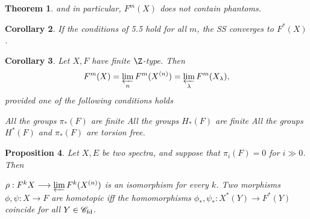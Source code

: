 \documentclass[11pt]{article}
\theoremstyle{plain}
\newtheorem{thm}{Theorem}[subsection]
\newtheorem{prop}[thm]{Proposition}
\newtheorem{cor}[thm]{Corollary}
\theoremstyle{definition}
\newcommand{\Specfd}{\scrC_\textup{fd}}
\begin{document}
{\begin{thm}
and in particular, $F^m(X)$ does not contain phantoms.
\end{thm}
\begin{cor}
If the conditions of 5.5 hold for all $m$, the SS converges to $F^*(X)$.
\end{cor}
\begin{cor}
Let $X,F$ have finite $\Z$-type. Then
\[F^m(X)=\varprojlim_n F^m(X^{(n)})=\varprojlim_\lambda F^m(X_\lambda),\]
provided one of the following conditions holds\upcol
\begin{itemise}
\itm[(i)] All the groups $\pi_*(F)$ are finite\upsemi
\itm[(ii)] All the groups $H_*(F)$ are finite\upsemi
\itm[(iii)] All the groups $H^*(F)$ and $\pi_*(F)$ are torsion free.
\end{itemise}
\end{cor}
\begin{prop}
Let $X,E$ be two spectra, and suppose that $\pi_i(F)=0$ for $i\gg0$. Then
\begin{itemise}
\itm[(i)] $\rho:F^kX\to\varprojlim F^k(X^{(n)})$ is an isomorphism for every
$k$.
\itm[(ii)] Two morphisms $\phi,\psi:X\to F$ are homotopic iff the homomorphisms
$\phi_*,\psi_*:X^*(Y)\to F^*(Y)$ coincide for all $Y\in\Specfd$.
\end{itemise}
\end{prop}
}   %
\end{document}
